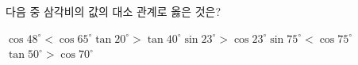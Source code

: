 다음 중 삼각비의 값의 대소 관계로 옳은 것은?
\begin{choicesii}{$\cos 48^\circ<\cos 65^\circ$}{$\tan 20^\circ>\tan 40^\circ$}{$\sin 23^\circ>\cos 23^\circ$}{$\sin 75^\circ<\cos 75^\circ$}{$\tan 50^\circ>\cos 70^\circ$}\end{choicesii}
